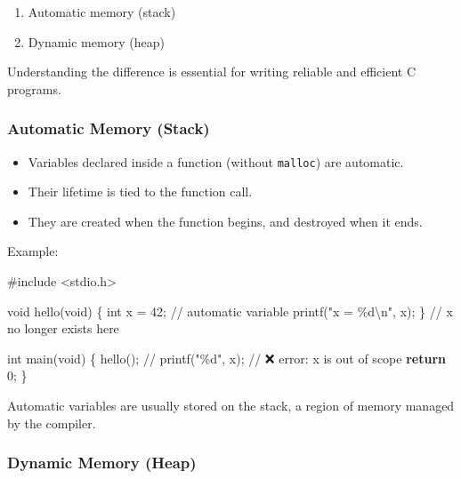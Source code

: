\documentclass[
  letterpaper,
  DIV=11,
  numbers=noendperiod]{scrreprt}
\newenvironment{Shaded}{\begin{snugshade}}{\end{snugshade}}
\newcommand{\CommentTok}[1]{\textcolor[rgb]{0.37,0.37,0.37}{#1}}
\newcommand{\ControlFlowTok}[1]{\textcolor[rgb]{0.00,0.23,0.31}{\textbf{#1}}}
\newcommand{\DataTypeTok}[1]{\textcolor[rgb]{0.68,0.00,0.00}{#1}}
\newcommand{\DecValTok}[1]{\textcolor[rgb]{0.68,0.00,0.00}{#1}}
\newcommand{\ImportTok}[1]{\textcolor[rgb]{0.00,0.46,0.62}{#1}}
\newcommand{\NormalTok}[1]{\textcolor[rgb]{0.00,0.23,0.31}{#1}}
\newcommand{\OperatorTok}[1]{\textcolor[rgb]{0.37,0.37,0.37}{#1}}
\newcommand{\PreprocessorTok}[1]{\textcolor[rgb]{0.68,0.00,0.00}{#1}}
\newcommand{\SpecialCharTok}[1]{\textcolor[rgb]{0.37,0.37,0.37}{#1}}
\newcommand{\StringTok}[1]{\textcolor[rgb]{0.13,0.47,0.30}{#1}}
\providecommand{\tightlist}{%
  \setlength{\itemsep}{0pt}\setlength{\parskip}{0pt}}
\begin{document}
\begin{enumerate}
\def\labelenumi{\arabic{enumi}.}
\tightlist
\item
  Automatic memory (stack)
\item
  Dynamic memory (heap)
\end{enumerate}

Understanding the difference is essential for writing reliable and
efficient C programs.

\subsubsection{Automatic Memory (Stack)}\label{automatic-memory-stack}

\begin{itemize}
\tightlist
\item
  Variables declared inside a function (without \texttt{malloc}) are
  automatic.
\item
  Their lifetime is tied to the function call.
\item
  They are created when the function begins, and destroyed when it ends.
\end{itemize}

Example:

\begin{Shaded}
\begin{Highlighting}[]
\PreprocessorTok{\#include }\ImportTok{\textless{}stdio.h\textgreater{}}

\DataTypeTok{void}\NormalTok{ hello}\OperatorTok{(}\DataTypeTok{void}\OperatorTok{)} \OperatorTok{\{}
    \DataTypeTok{int}\NormalTok{ x }\OperatorTok{=} \DecValTok{42}\OperatorTok{;}  \CommentTok{// automatic variable}
\NormalTok{    printf}\OperatorTok{(}\StringTok{"x = }\SpecialCharTok{\%d\textbackslash{}n}\StringTok{"}\OperatorTok{,}\NormalTok{ x}\OperatorTok{);}
\OperatorTok{\}} \CommentTok{// x no longer exists here}

\DataTypeTok{int}\NormalTok{ main}\OperatorTok{(}\DataTypeTok{void}\OperatorTok{)} \OperatorTok{\{}
\NormalTok{    hello}\OperatorTok{();}
    \CommentTok{// printf("\%d", x);  // ❌ error: x is out of scope}
    \ControlFlowTok{return} \DecValTok{0}\OperatorTok{;}
\OperatorTok{\}}
\end{Highlighting}
\end{Shaded}

Automatic variables are usually stored on the stack, a region of memory
managed by the compiler.

\subsubsection{Dynamic Memory (Heap)}\label{dynamic-memory-heap}
\end{document}

